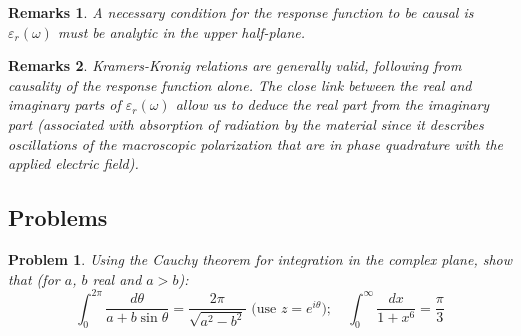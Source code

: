 \documentclass[a4paper]{article}
\newtheorem{remarks}{Remarks}[section]
\theoremstyle{new}
\newtheorem{qns}{Problem}[section]
\begin{document}
\begin{remarks}
A necessary condition for the response function to be causal is $\varepsilon_r(\omega)$ must be analytic in the upper half-plane.
\end{remarks}
\begin{remarks}
Kramers-Kronig relations are generally valid, following from causality of the response function alone. The close link between the real and imaginary parts of $\varepsilon_r(\omega)$ allow us to deduce the real part from the imaginary part (associated with absorption of radiation by the material since it describes oscillations of the macroscopic polarization that are in phase quadrature with the applied electric field).
\end{remarks}
\newpage
\subsection{Problems}
\begin{qns}
Using the Cauchy theorem for integration in the complex plane, show that (for $a$, $b$ real and $a > b$):
$$\int_0^{2\pi}\frac{d\theta}{a+b\sin\theta}=\frac{2\pi}{\sqrt{a^2-b^2}}\text{ (use }z=e^{i\theta});\quad\int_0^\infty\frac{dx}{1+x^6}=\frac{\pi}{3}$$
\end{qns}
\end{document}
